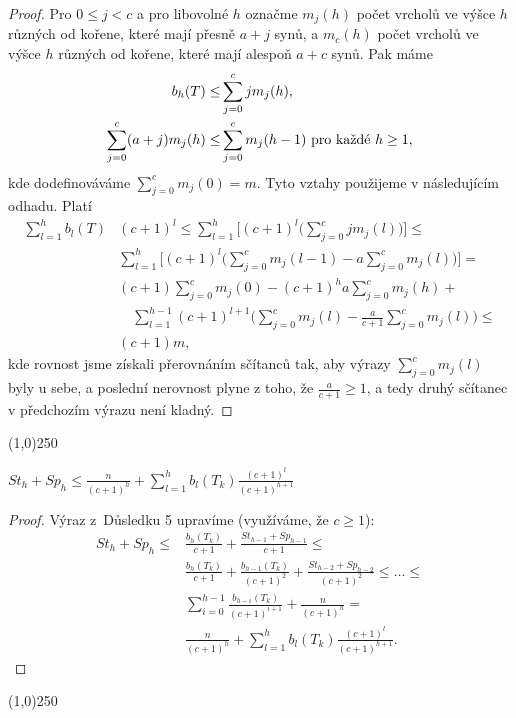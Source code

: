 \documentclass[a4paper,12pt]{article}
\newenvironment{myproof}{
  \begin{proof}
    
  }{
  \end{proof}
  \begin{center}
   \line(1,0){250}
   \end{center}
  }
\begin{document}
\begin{myproof}Pro $0\le j<c$ a pro libovolné $h$ 
označme $m_j(h)$ počet vrcholů ve výšce $h$ 
různých od kořene, které mají přesně $a
+j$ 
synů, a $m_c(h)$ počet vrcholů ve výšce $
h$ 
různých od kořene, které mají alespoň $a+c$ 
synů. Pak máme
\begin{align*} b_h(T)\le&\sum_{j=0}^cjm_j(h)\text{\rm},\\
\sum_{j=0}^c(a+j)m_j(h)\le&\sum_{j=0}^cm_j(h-1)\text{\rm\ pro každé }
h\ge 1,\end{align*}
kde dodefinováváme $\sum_{j=0}^cm_j(0)=m$. Tyto vztahy 
použijeme v následujícím odhadu. Platí 
\begin{align*}\sum_{l=1}^hb_l(T)&(c+1)^l\le\sum_{l=1}^h\big[(c+1)^l\big
(\sum_{j=0}^cjm_j(l)\big)\big]\le\\
&\sum_{l=1}^h\big[(c+1)^l\big(\sum_{j=0}^cm_j(l-1)-a\sum_{j=0}^cm_
j(l)\big)\big]=\\
&(c+1)\sum_{j=0}^cm_j(0)-(c+1)^ha\sum_{j=0}^cm_j(h)+\\
&\quad\sum_{l=1}^{h-1}(c+1)^{l+1}\big(\sum_{j=0}^cm_j(l)-\frac a{
c+1}\sum_{j=0}^cm_j(l)\big)\le\\
&(c+1)m,\end{align*}
kde rovnost jsme získali přerovnáním sčítanců 
tak, aby výrazy $\sum_{j=0}^cm_j(l)$ byly u sebe, a poslední 
nerovnost plyne z toho, že $\frac a{c+1}\ge 1$, a tedy druhý sčítanec 
v předchozím výrazu není kladný.
\end{myproof}

\begin{lemma_counting}
    $St_h+Sp_h\le\frac n{(c+1)^h}+\sum_{l=1}^hb_l(T_k)\frac {(c+1)^l}{(c+1)^{h+1}}$
\end{lemma_counting}

\begin{myproof}
     Výraz z~Důsledku 5 upravíme (využíváme, že $
    c\ge 1$):
    \begin{align*} St_h+Sp_h\le&\frac {b_h(T_k)}{c+1}+\frac {St_{h-1}+Sp_{h
    -1}}{c+1}\le\\
    &\frac {b_h(T_k)}{c+1}+\frac {b_{h-1}(T_k)}{(c+1)^2}+\frac {St_{h
    -2}+Sp_{h-2}}{(c+1)^2}\le\dots\le\\
    &\sum_{i=0}^{h-1}\frac {b_{h-i}(T_k)}{(c+1)^{i+1}}+\frac n{(c+1)^
    h}=\\
    &\frac n{(c+1)^h}+\sum_{l=1}^hb_l(T_k)\frac {(c+1)^l}{(c+1)^{h+1}}
    .\end{align*}
\end{myproof}
\end{document}
